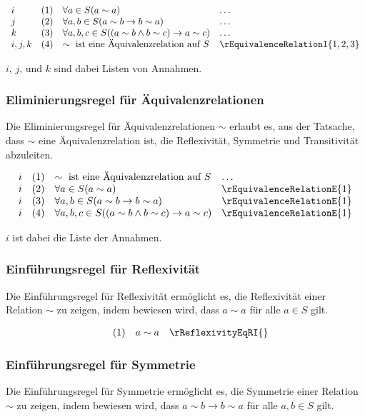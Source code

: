 \documentclass[main.tex]{subfiles}
\begin{document}
\[
\begin{array}{llll}
    i       & (1) & \forall a \in S (a \sim a) & \dots \\
    j       & (2) & \forall a, b \in S (a \sim b \rightarrow b \sim a) & \dots \\
    k       & (3) & \forall a, b, c \in S ((a \sim b \land b \sim c) \rightarrow a \sim c) & \dots \\
    i,j,k   & (4) & \sim \text{ ist eine Äquivalenzrelation auf } S & \rEquivalenceRelationI{1,2,3}
\end{array}
\]

\(i\), \(j\), und \(k\) sind dabei Listen von Annahmen.

\subsubsection*{Eliminierungsregel für Äquivalenzrelationen}
\label{rule:rEquivalenceRelationE}
Die Eliminierungsregel für Äquivalenzrelationen \(\sim\) erlaubt es, aus der Tatsache, dass \(\sim\) eine Äquivalenzrelation ist, die Reflexivität, Symmetrie und Transitivität abzuleiten.

\[
\begin{array}{llll}
    i       & (1) & \sim \text{ ist eine Äquivalenzrelation auf } S & \dots \\
    i       & (2) & \forall a \in S (a \sim a) & \rEquivalenceRelationE{1} \\
    i       & (3) & \forall a, b \in S (a \sim b \rightarrow b \sim a) & \rEquivalenceRelationE{1} \\
    i       & (4) & \forall a, b, c \in S ((a \sim b \land b \sim c) \rightarrow a \sim c) & \rEquivalenceRelationE{1}
\end{array}
\]

\(i\) ist dabei die Liste der Annahmen.

\subsubsection*{Einführungsregel für Reflexivität}
\label{rule:rReflexivityEqRI}
Die Einführungsregel für Reflexivität ermöglicht es, die Reflexivität einer Relation \(\sim\) zu zeigen, indem bewiesen wird, dass \(a \sim a\) für alle \(a \in S\) gilt.

\[
\begin{array}{llll}
      & (1) & a \sim a & \rReflexivityEqRI{}
\end{array}
\]

\subsubsection*{Einführungsregel für Symmetrie}
\label{rule:rSymmetryEqRI}
Die Einführungsregel für Symmetrie ermöglicht es, die Symmetrie einer Relation \(\sim\) zu zeigen, indem bewiesen wird, dass \(a \sim b \rightarrow b \sim a\) für alle \(a, b \in S\) gilt.
\end{document}
